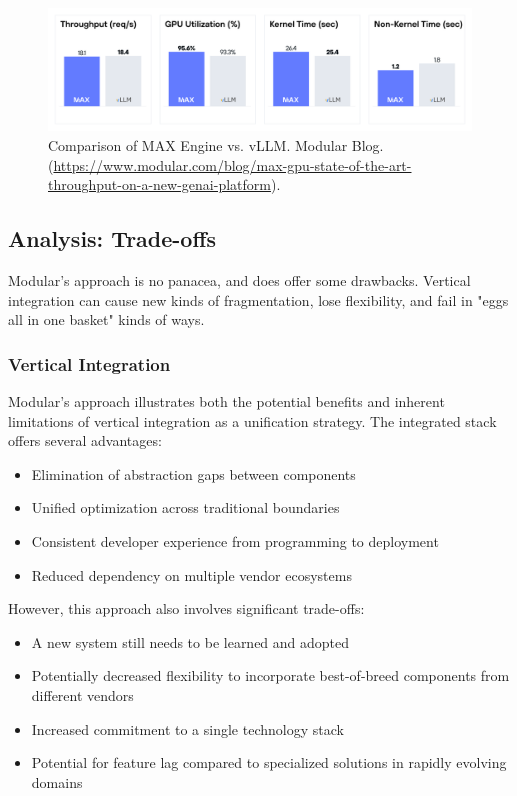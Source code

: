 \documentclass[manuscript,screen,review,format=acmsmall]{acmart}
\begin{document}
\begin{figure}[h]
\label{vllmmetrics}
  \centering
  \includegraphics[width=\linewidth]{figures/max-vllm-gpu.png}
  \caption{Comparison of MAX Engine vs. vLLM.
    Modular Blog. (\url{https://www.modular.com/blog/max-gpu-state-of-the-art-throughput-on-a-new-genai-platform}).}
\end{figure}


\subsection{Analysis: Trade-offs}

Modular's approach is no panacea, and does offer some drawbacks. Vertical integration can cause new kinds of fragmentation, lose flexibility, and fail in "eggs all in one basket" kinds of ways.

\subsubsection{Vertical Integration}

Modular's approach illustrates both the potential benefits and inherent limitations of vertical integration as a unification strategy. The integrated stack offers several advantages:
\begin{itemize}
    \item Elimination of abstraction gaps between components
    \item Unified optimization across traditional boundaries
    \item Consistent developer experience from programming to deployment
    \item Reduced dependency on multiple vendor ecosystems
\end{itemize}

However, this approach also involves significant trade-offs:
\begin{itemize}
    \item A new system still needs to be learned and adopted
    \item Potentially decreased flexibility to incorporate best-of-breed components from different vendors
    \item Increased commitment to a single technology stack
    \item Potential for feature lag compared to specialized solutions in rapidly evolving domains
\end{itemize}
\end{document}
